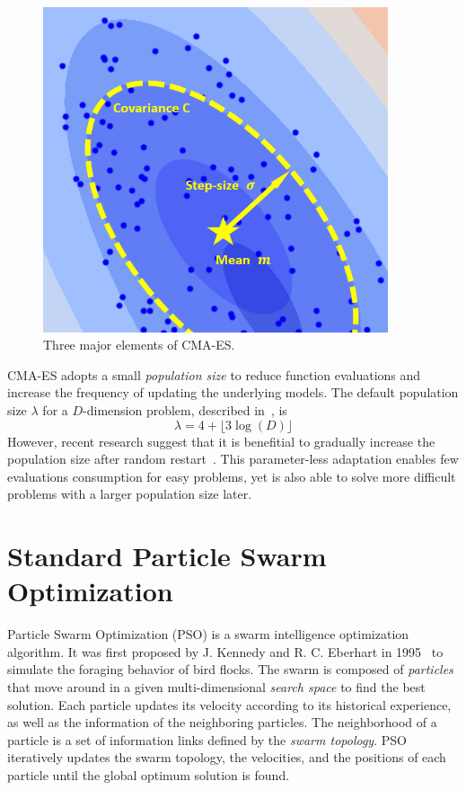 \begin{figure}
\centering
\includegraphics[width=4in]{CMA_elements}
\caption{Three major elements of CMA-ES.}\label{fig:CMA_elements}
\end{figure}

CMA-ES adopts a small \textit{population size} to reduce function evaluations and increase the frequency of updating the underlying models.
The default population size $\lambda$ for a $D$-dimension problem, described in~\cite{Hansen:2006:CMA_ES_review}, is
\begin{displaymath}
\lambda = 4 + \lfloor 3 \log(D) \rfloor 
\end{displaymath}
However, recent research suggest that it is benefitial to gradually increase the population size after random restart~\cite{Auger:2005:IPOP_CMAES}.
This parameter-less adaptation enables few evaluations consumption for easy problems, 
yet is also able to solve more difficult problems with a larger population size later.





\section{Standard Particle Swarm Optimization}

Particle Swarm Optimization (PSO) is a swarm intelligence optimization algorithm. 
It was first proposed by J. Kennedy and R. C. Eberhart in 1995~\cite{Kennedy:1995:PSO} to simulate the foraging behavior of bird flocks.
The swarm is composed of \textit{particles} that move around in a given multi-dimensional \textit{search space} to find the best solution.
Each particle updates its velocity according to its historical experience, as well as the information of the neighboring particles.
The neighborhood of a particle is a set of information links defined by the \textit{swarm topology}. %
PSO iteratively updates the swarm topology, the velocities, and the positions of each particle until the global optimum solution is found.



